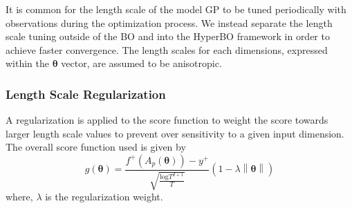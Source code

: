 It is common for the length scale of the model GP to be tuned periodically with observations during the optimization process. We instead separate the length scale tuning outside of the BO and into the HyperBO framework in order to achieve faster convergence. The length scales for each dimensions, expressed within the $\boldsymbol{\theta}$ vector, are assumed to be anisotropic.

\subsubsection{Length Scale Regularization}
A regularization is applied to the score function to weight the score towards larger length scale values to prevent over sensitivity to a given input dimension. The overall score function used is given by
\begin{equation}\label{eq:length_score}
g(\boldsymbol{\theta}) = \frac{f^{+}(A_{p}(\boldsymbol{\theta}))-y^{+}}{\sqrt{\frac{\text{log} T^{d+1}}{T}}}\left(1-\lambda\left\|\boldsymbol{\theta}\right\|\right)
\end{equation}
where, $\lambda$ is the regularization weight.